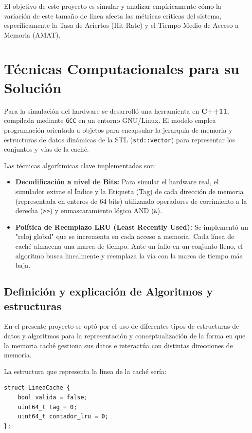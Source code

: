 \documentclass[12pt,a4paper]{article}
\begin{document}
El objetivo de este proyecto es simular y analizar empíricamente cómo la variación de este tamaño de línea afecta las métricas críticas del sistema, específicamente la Tasa de Aciertos (Hit Rate) y el Tiempo Medio de Acceso a Memoria (AMAT).

\section{Técnicas Computacionales para su Solución}
Para la simulación del hardware se desarrolló una herramienta en \textbf{C++11}, compilada mediante \texttt{GCC} en un entorno GNU/Linux. El modelo emplea programación orientada a objetos para encapsular la jerarquía de memoria y estructuras de datos dinámicas de la STL (\texttt{std::vector}) para representar los conjuntos y vías de la caché.

Las técnicas algorítmicas clave implementadas son:
\begin{itemize}
    \item \textbf{Decodificación a nivel de Bits:} Para simular el hardware real, el simulador extrae el Índice y la Etiqueta (Tag) de cada dirección de memoria (representada en enteros de 64 bits) utilizando operadores de corrimiento a la derecha (\texttt{>>}) y enmascaramiento lógico AND (\texttt{\&}).
    \item \textbf{Política de Reemplazo LRU (Least Recently Used):} Se implementó un "reloj global" que se incrementa en cada acceso a memoria. Cada línea de caché almacena una marca de tiempo. Ante un fallo en un conjunto lleno, el algoritmo busca linealmente y reemplaza la vía con la marca de tiempo más baja.
\end{itemize}

\subsection{Definición y explicación de Algoritmos y estructuras}
En el presente proyecto se optó por el uso de diferentes tipos de estructuras de datos y algoritmos para la representación y conceptualización de la forma en que la memoria caché gestiona sus datos e interactúa con distintas direcciones de memoria.

La estructura que representa la línea de la caché sería:
\begin{verbatim}
struct LineaCache {    
    bool valida = false;    
    uint64_t tag = 0;    
    uint64_t contador_lru = 0;
};
\end{verbatim}
\end{document}
